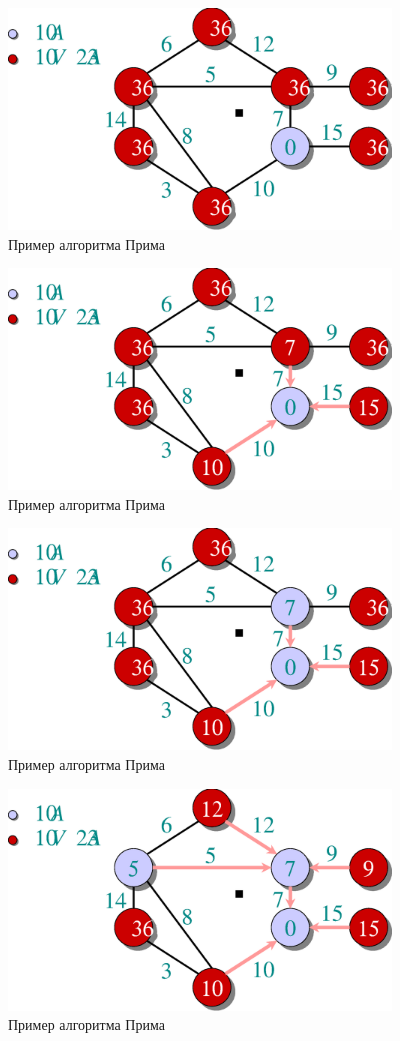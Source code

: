 \documentclass[a4paper,11pt]{article}
\begin{document}
\begin{figure}[ht]
  \centering
  \includegraphics[width=4in]{lecture16/prim2.eps}
  \caption{Пример алгоритма Прима}
\end{figure}
\begin{figure}[ht]
  \centering
  \includegraphics[width=4in]{lecture16/prim3.eps}
  \caption{Пример алгоритма Прима}
\end{figure}
\begin{figure}[ht]
  \centering
  \includegraphics[width=4in]{lecture16/prim4.eps}
  \caption{Пример алгоритма Прима}
\end{figure}
\begin{figure}[ht]
  \centering
  \includegraphics[width=4in]{lecture16/prim6.eps}
  \caption{Пример алгоритма Прима}
\end{figure}
\end{document}
